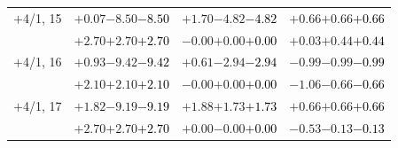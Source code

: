 \documentclass[compress]{beamer}
\begin{document}
\begin{frame}
\begin{tabular}{r | c | c | c}
$+$4/1, 15 & $+0.07$\hspace{0.1 cm}$-8.50$\hspace{0.1 cm}\textcolor{black}{$-8.50$} & $+1.70$\hspace{0.1 cm}$-4.82$\hspace{0.1 cm}\textcolor{black}{$-4.82$} & $+0.66$\hspace{0.1 cm}$+0.66$\hspace{0.1 cm}\textcolor{black}{$+0.66$} \\
           & $+2.70$\hspace{0.1 cm}$+2.70$\hspace{0.1 cm}\textcolor{black}{$+2.70$} & $-0.00$\hspace{0.1 cm}$+0.00$\hspace{0.1 cm}\textcolor{black}{$+0.00$} & $+0.03$\hspace{0.1 cm}$+0.44$\hspace{0.1 cm}\textcolor{black}{$+0.44$} \\
$+$4/1, 16 & $+0.93$\hspace{0.1 cm}$-9.42$\hspace{0.1 cm}\textcolor{black}{$-9.42$} & $+0.61$\hspace{0.1 cm}$-2.94$\hspace{0.1 cm}\textcolor{black}{$-2.94$} & $-0.99$\hspace{0.1 cm}$-0.99$\hspace{0.1 cm}\textcolor{black}{$-0.99$} \\
           & $+2.10$\hspace{0.1 cm}$+2.10$\hspace{0.1 cm}\textcolor{black}{$+2.10$} & $-0.00$\hspace{0.1 cm}$+0.00$\hspace{0.1 cm}\textcolor{black}{$+0.00$} & $-1.06$\hspace{0.1 cm}$-0.66$\hspace{0.1 cm}\textcolor{black}{$-0.66$} \\
$+$4/1, 17 & $+1.82$\hspace{0.1 cm}$-9.19$\hspace{0.1 cm}\textcolor{black}{$-9.19$} & $+1.88$\hspace{0.1 cm}$+1.73$\hspace{0.1 cm}\textcolor{black}{$+1.73$} & $+0.66$\hspace{0.1 cm}$+0.66$\hspace{0.1 cm}\textcolor{black}{$+0.66$} \\
           & $+2.70$\hspace{0.1 cm}$+2.70$\hspace{0.1 cm}\textcolor{black}{$+2.70$} & $+0.00$\hspace{0.1 cm}$-0.00$\hspace{0.1 cm}\textcolor{black}{$+0.00$} & $-0.53$\hspace{0.1 cm}$-0.13$\hspace{0.1 cm}\textcolor{black}{$-0.13$} \\

\end{tabular}
\end{frame}
\end{document}
